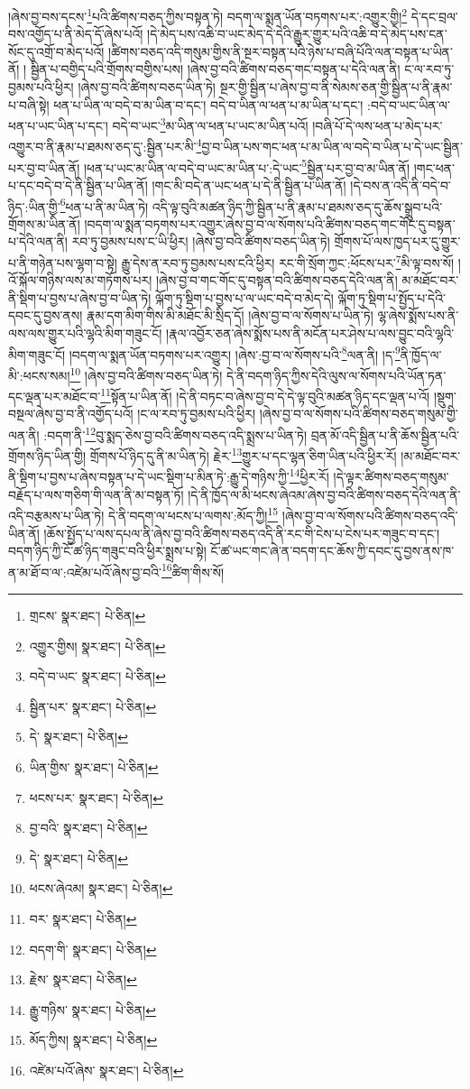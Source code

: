 །ཞེས་བྱ་བས་དངས་\footnote{གྲངས་  སྣར་ཐང་།  པེ་ཅིན། }པའི་ཚིགས་བཅད་ཀྱིས་བསྟན་ཏེ། བདག་ལ་སྨན་ཡོན་བཏགས་པར་:འགྱུར་གྱི།\footnote{འགྱུར་གྱིས།  སྣར་ཐང་།  པེ་ཅིན། } དེ་དང་བྲལ་བས་འགྱོད་པ་ནི་མེད་དོ་ཞེས་པའོ། །དེ་མེད་པས་འཆི་བ་ཡང་མེད་དེ་དེའི་རྒྱུར་གྱུར་པའི་འཆི་བ་དེ་མེད་པས་ངན་སོང་དུ་འགྲོ་བ་མེད་པའོ། །ཚིགས་བཅད་འདི་གསུམ་གྱིས་ནི་སྔར་བསྟན་པའི་ཉེས་པ་བཞི་པོའི་ལན་བསྟན་པ་ཡིན་ནོ། །
སྦྱིན་པ་བགྱིད་པའི་གྲོགས་བགྱིས་པས། །ཞེས་བྱ་བའི་ཚིགས་བཅད་གང་བསྟན་པ་དེའི་ལན་ནི། ང་ལ་རབ་ཏུ་བྱམས་པའི་ཕྱིར། །ཞེས་བྱ་བའི་ཚིགས་བཅད་ཡིན་ཏེ། སྔར་གྱི་སྦྱིན་པ་ཞེས་བྱ་བ་ནི་སེམས་ཅན་གྱི་སྦྱིན་པ་ནི་རྣམ་པ་བཞི་སྟེ། ཕན་པ་ཡིན་ལ་བདེ་བ་མ་ཡིན་བ་དང་། བདེ་བ་ཡིན་ལ་ཕན་པ་མ་ཡིན་པ་དང་། :བདེ་བ་ཡང་ཡིན་ལ་ཕན་པ་ཡང་ཡིན་པ་དང་། བདེ་བ་ཡང་\footnote{བདེ་བ་ཡང་  སྣར་ཐང་།  པེ་ཅིན། }མ་ཡིན་ལ་ཕན་པ་ཡང་མ་ཡིན་པའོ། །བཞི་པོ་དེ་ལས་ཕན་པ་མེད་པར་འགྱུར་བ་ནི་རྣམ་པ་ཐམས་ཅད་དུ་:སྦྱིན་པར་མི་\footnote{སྦྱིན་པར་  སྣར་ཐང་།  པེ་ཅིན། }བྱ་བ་ཡིན་པས་གང་ཕན་པ་མ་ཡིན་ལ་བདེ་བ་ཡིན་པ་དེ་ཡང་སྦྱིན་པར་བྱ་བ་ཡིན་ནོ། །ཕན་པ་ཡང་མ་ཡིན་ལ་བདེ་བ་ཡང་མ་ཡིན་པ་:དེ་ཡང་\footnote{དེ་  སྣར་ཐང་།  པེ་ཅིན། }སྦྱིན་པར་བྱ་བ་མ་ཡིན་ནོ། །གང་ཕན་པ་དང་བདེ་བ་དེ་ནི་སྦྱིན་པ་ཡིན་ནོ། །གང་མི་བདེ་ན་ཡང་ཕན་པ་དེ་ནི་སྦྱིན་པ་ཡིན་ནོ། །དེ་བས་ན་འདི་ནི་བདེ་བ་ཉིད་:ཡིན་གྱི་\footnote{ཡིན་གྱིས་  སྣར་ཐང་།  པེ་ཅིན། }ཕན་པ་ནི་མ་ཡིན་ཏེ། འདི་ལྟ་བུའི་མཚན་ཉིད་ཀྱི་སྦྱིན་པ་ནི་རྣམ་པ་ཐམས་ཅད་དུ་ཆོས་སྒྲུབ་པའི་གྲོགས་མ་ཡིན་ནོ། །བདག་ལ་སྨན་བཏགས་པར་འགྱུར་ཞེས་བྱ་བ་ལ་སོགས་པའི་ཚིགས་བཅད་གང་གོང་དུ་བསྟན་པ་དེའི་ལན་ནི། རབ་ཏུ་བྱམས་པས་ང་ཡི་ཕྱིར། །ཞེས་བྱ་བའི་ཚིགས་བཅད་ཡིན་ཏེ། གྲོགས་པོ་ལས་ཁྱད་པར་དུ་གྱུར་པ་ནི་གཉེན་པས་ལྷག་བ་སྟེ། རྒྱུ་དེས་ན་རབ་ཏུ་བྱམས་པས་ངའི་ཕྱིར། རང་གི་སྲོག་ཀྱང་:ཕོངས་པར་\footnote{ཕངས་པར་  སྣར་ཐང་།  པེ་ཅིན། }མི་ལྟ་བས་སོ། །འོ་སྐོལ་གཉིས་ལས་མ་གཏོགས་པར། །ཞེས་བྱ་བ་གང་གོང་དུ་བསྟན་བའི་ཚིགས་བཅད་དེའི་ལན་ནི། མ་མཐོང་བར་ནི་སྡིག་པ་བྱས་པ་ཞེས་བྱ་བ་ཡིན་ཏེ། ལྐོག་ཏུ་སྡིག་པ་བྱས་པ་ལ་ཡང་བདེ་བ་མེད་དེ། ལྐོག་ཏུ་སྡིག་པ་སྤྱོད་པ་དེའི་དབང་དུ་བྱས་ནས། རྣམ་དག་མིག་གིས་མི་མཐོང་མི་སྲིད་དོ། །ཞེས་བྱ་བ་ལ་སོགས་པ་ཡིན་ཏེ། ལྷ་ཞེས་སྨོས་པས་ནི་ལས་ལས་གྱུར་པའི་ལྷའི་མིག་གཟུང་ངོ། །རྣལ་འབྱོར་ཅན་ཞེས་སྨོས་པས་ནི་མངོན་པར་ཤེས་པ་ལས་བྱུང་བའི་ལྷའི་མིག་གཟུང་ངོ། །བདག་ལ་སྨན་ཡོན་བཏགས་པར་འགྱུར། །ཞེས་:བྱ་བ་ལ་སོགས་པའི་\footnote{བྱ་བའི་  སྣར་ཐང་།  པེ་ཅིན། }ལན་ནི། །ད་\footnote{དེ་  སྣར་ཐང་།  པེ་ཅིན། }ནི་ཁྱོད་ལ་མི་:ཕངས་སམ།\footnote{ཕངས་ཞེའམ།  སྣར་ཐང་།  པེ་ཅིན། } །ཞེས་བྱ་བའི་ཚིགས་བཅད་ཡིན་ཏེ། དེ་ནི་བདག་ཉིད་ཀྱིས་དེའི་ལུས་ལ་སོགས་པའི་ཡོན་ཏན་དང་ལྡན་པར་མཐོང་བ་\footnote{བར་  སྣར་ཐང་།  པེ་ཅིན། }སྟོན་པ་ཡིན་ནོ། །དེ་ནི་བཏང་བ་ཞེས་བྱ་བ་དེ་དེ་ལྟ་བུའི་མཚན་ཉིད་དང་ལྡན་པ་འོ། །སྡུག་བསྔལ་ཞེས་བྱ་བ་ནི་འགྱོད་པའོ། །ང་ལ་རབ་ཏུ་བྱམས་པའི་ཕྱིར། །ཞེས་བྱ་བ་ལ་སོགས་པའི་ཚིགས་བཅད་གསུམ་གྱི་ལན་ནི། :བདག་ནི་\footnote{བདག་གི་  སྣར་ཐང་།  པེ་ཅིན། }བུ་སྨད་ཅེས་བྱ་བའི་ཚིགས་བཅད་འདི་སྨྲས་པ་ཡིན་ཏེ། བྲན་མོ་འདི་སྦྱིན་པ་ནི་ཆོས་སྦྱིན་པའི་གྲོགས་ཉིད་ཡིན་གྱི། གྲོགས་པོ་ཉིད་དུ་ནི་མ་ཡིན་ཏེ། རྗེར་\footnote{རྗེས་  སྣར་ཐང་།  པེ་ཅིན། }གྱུར་པ་དང་ལྷན་ཅིག་ཡིན་པའི་ཕྱིར་རོ། །མ་མཐོང་བར་ནི་སྡིག་པ་བྱས་པ་ཞེས་བསྟན་པ་དེ་ཡང་སྡིག་པ་མིན་ཏེ་:རྒྱུ་དེ་གཉིས་ཀྱི་\footnote{རྒྱུ་གཉིས་  སྣར་ཐང་།  པེ་ཅིན། }ཕྱིར་རོ། །དེ་ལྟར་ཚིགས་བཅད་གསུམ་བརྗོད་པ་ལས་གཅིག་གི་ལན་ནི་མ་བསྟན་ཏོ། །དེ་ནི་ཁྱོད་ལ་མི་ཕངས་ཞེའམ་ཞེས་བྱ་བའི་ཚིགས་བཅད་དེའི་ལན་ནི་འདི་བརྩམས་པ་ཡིན་ཏེ། དེ་ནི་བདག་ལ་ཕངས་པ་ལགས་:མོད་ཀྱི།\footnote{མོད་ཀྱིས།  སྣར་ཐང་།  པེ་ཅིན། } །ཞེས་བྱ་བ་ལ་སོགས་པའི་ཚིགས་བཅད་འདི་ཡིན་ནོ། །ཆོས་སྤྱོད་པ་ལས་དཔལ་ནི་ཞེས་བྱ་བའི་ཚིགས་བཅད་འདི་ནི་རང་གི་ངེས་པ་ངེས་པར་གཟུང་བ་དང་། བདག་ཉིད་ཀྱི་ངོ་ཚ་ཉིད་གཟུང་བའི་ཕྱིར་སྨྲས་པ་སྟེ། ངོ་ཚ་ཡང་གང་ཞེ་ན་བདག་དང་ཆོས་ཀྱི་དབང་དུ་བྱས་ནས་ཁ་ན་མ་ཐོ་བ་ལ་:འཛེམ་པའོ་ཞེས་བྱ་བའི་\footnote{འཛེམ་པའོ་ཞེས་  སྣར་ཐང་།  པེ་ཅིན། }ཚིག་གིས་སོ། 
